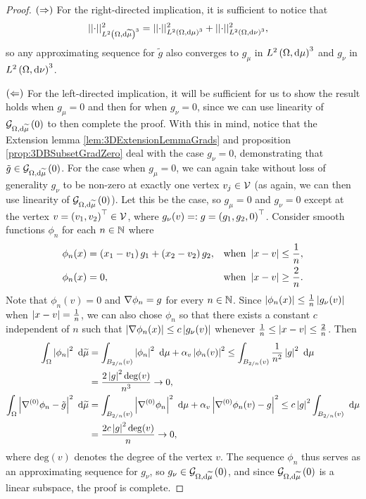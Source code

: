 \begin{proof}
	$\left( \Rightarrow \right)$ For the right-directed implication, it is sufficient to notice that
	\begin{align*}
		\lvert\lvert \cdot \rvert\rvert_{L^{2}\left( \Omega,\mathrm{d}\widetilde{\mu} \right)^3}^2 &= \lvert\lvert \cdot \rvert\rvert_{L^{2}\left( \Omega,\mathrm{d}\mu \right)^3}^2 + \lvert\lvert \cdot \rvert\rvert_{L^{2}\left( \Omega,\mathrm{d}\nu \right)^3}^2,
	\end{align*}
	so any approximating sequence for $\tilde{g}$ also converges to $g_\mu$ in $L^{2}\left( \Omega,\mathrm{d}\mu \right)^3$ and $g_\nu$ in $L^{2}\left( \Omega,\mathrm{d}\nu \right)^3$.
	
	$\left( \Leftarrow \right)$ For the left-directed implication, it will be sufficient for us to show the result holds when $g_\mu=0$ and then for when $g_\nu=0$, since we can use linearity of $\mathcal{G}_{ \Omega, \mathrm{d}\widetilde{\mu}}\left( 0 \right)$ to then complete the proof.
	With this in mind, notice that the Extension lemma \ref{lem:3DExtensionLemmaGrads} and proposition \ref{prop:3DBSubsetGradZero} deal with the case $g_\nu=0$, demonstrating that $\tilde{g}\in\mathcal{G}_{ \Omega, \mathrm{d}\widetilde{\mu}}\left( 0 \right)$.
	For the case when $g_\mu=0$, we can again take without loss of generality $g_\nu$ to be non-zero at exactly one vertex $v_j\in\mathcal{V}$ (as again, we can then use linearity of $\mathcal{G}_{ \Omega, \mathrm{d}\widetilde{\mu}}\left( 0 \right)$).
	Let this be the case, so $g_\mu=0$ and $g_\nu=0$ except at the vertex $v=\left( v_1,v_2 \right)^\top\in\mathcal{V}$, where $g_\nu(v) =: g = \left( g_1,g_2,0 \right)^\top$.
	Consider smooth functions $\phi_n$ for each $n\in\mathbb{N}$ where
	\begin{align*}
		\phi_n(x) &= \left( x_1-v_1 \right)g_1 + \left( x_2-v_2 \right)g_2, &\text{when } \left\lvert x-v \right\rvert\leq\frac{1}{n}, \\
		\phi_n(x) &= 0, &\text{when } \left\lvert x-v \right\rvert\geq\frac{2}{n}.
	\end{align*}
	Note that $\phi_n(v)=0$ and $\nabla\phi_n=g$ for every $n\in\mathbb{N}$.
	Since $\left\lvert \phi_n(x) \right\rvert\leq\frac{1}{n}\left\lvert g_\nu(v) \right\rvert$ when $\left\lvert x-v \right\rvert=\frac{1}{n}$, we can also chose $\phi_n$ so that there exists a constant $c$ independent of $n$ such that $\left\lvert \nabla\phi_n(x) \right\rvert\leq c\left\lvert g_\nu(v) \right\rvert$ whenever $\frac{1}{n}\leq\left\lvert x-v \right\rvert\leq\frac{2}{n}$.
	Then
	\begin{align*}
		\int_{\Omega} \left\lvert \phi_n \right\rvert^2  \ \mathrm{d}\widetilde{\mu}
		&= \int_{B_{2/n}(v)} \left\lvert \phi_n \right\rvert^2  \ \mathrm{d}\mu + \alpha_v\left\lvert \phi_n(v) \right\rvert^2
		\leq \int_{B_{2/n}(v)} \frac{1}{n^2}\left\lvert g \right\rvert^2  \ \mathrm{d}\mu \\
		&= \frac{2\left\lvert g \right\rvert^2 \mathrm{deg}(v)}{n^3} \rightarrow 0, \\
		\int_{\Omega} \left\lvert \nabla^{(0)}\phi_n - \tilde{g} \right\rvert^2  \ \mathrm{d}\widetilde{\mu}
		&= \int_{B_{2/n}(v)} \left\lvert \nabla^{(0)}\phi_n \right\rvert^2  \ \mathrm{d}\mu + \alpha_v\left\lvert \nabla^{(0)}\phi_n(v) - g \right\rvert^2
		\leq c\left\lvert g \right\rvert^2\int_{B_{2/n}(v)} \ \mathrm{d}\mu \\
		&= \frac{2c\left\lvert g \right\rvert^2\mathrm{deg}(v)}{n} \rightarrow 0,
	\end{align*}
	where $\mathrm{deg}(v)$ denotes the degree of the vertex $v$.
	The sequence $\phi_n$ thus serves as an approximating sequence for $g_\nu$, so $g_\nu\in\mathcal{G}_{ \Omega, \mathrm{d}\widetilde{\mu}}\left( 0 \right)$, and since $\mathcal{G}_{ \Omega, \mathrm{d}\widetilde{\mu}}\left( 0 \right)$ is a linear subspace, the proof is complete.
\end{proof}

